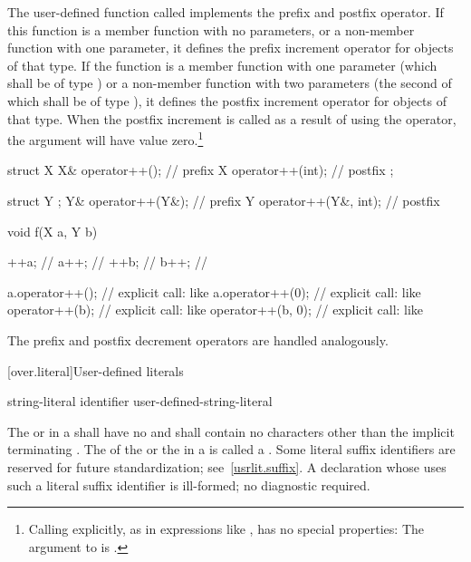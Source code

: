 \pnum
The user-defined function called
implements the prefix and postfix
\tcode{++}
operator.
If this function is a member function with no parameters, or a non-member
function with one parameter,
it defines the prefix increment operator
\tcode{++}
for objects of that type.
If the function is a member function with one parameter (which shall be of type
)
or a non-member function with two parameters (the second of which shall be of type
),
it defines the postfix increment operator
\tcode{++}
for objects of that type.
When the postfix increment is called as a result of using the
\tcode{++}
operator, the
argument will have value zero.\footnote{Calling
explicitly, as in expressions like
,
has no special properties:
The argument to
is
.}
\enterexample

\begin{codeblock}
struct X {
  X&   operator++();            // prefix 
  X    operator++(int);         // postfix 
};

struct Y { };
Y&   operator++(Y&);            // prefix 
Y    operator++(Y&, int);       // postfix 

void f(X a, Y b) {
  ++a;                          // 
  a++;                          // 
  ++b;                          // 
  b++;                          // 

  a.operator++();               // explicit call: like 
  a.operator++(0);              // explicit call: like 
  operator++(b);                // explicit call: like 
  operator++(b, 0);             // explicit call: like 
}
\end{codeblock}
\exitexample

\pnum
The prefix and postfix decrement operators
\tcode{-{-}}
are handled analogously.

[over.literal]{User-defined literals}%
%

\begin{bnf}
\br
     string-literal identifier\br
     user-defined-string-literal
\end{bnf}

\pnum
The  or 
in a  shall have no
 and shall contain no characters other than the
implicit terminating .
The  of the  or
the  in a  is called a
.
Some literal suffix identifiers are reserved for future standardization;
see~\ref{usrlit.suffix}.
A declaration whose  uses such a literal
suffix identifier is ill-formed; no diagnostic required.

